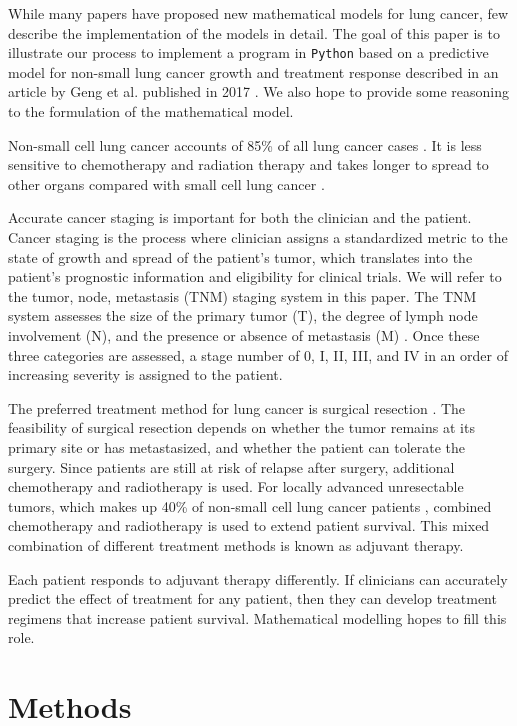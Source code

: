 \documentclass[letterpaper
, superscriptaddress
, twocolumn
, aps
]{revtex4}
\begin{document}
While many papers have proposed new mathematical models for lung cancer, few describe the implementation of the models in detail. The goal of this paper is to illustrate our process to implement a program in \texttt{Python} based on a predictive model for non-small lung cancer growth and treatment response described in an article by Geng et al. published in 2017 \cite{Geng2017}. We also hope to provide some reasoning to the formulation of the mathematical model.

Non-small cell lung cancer accounts of 85\% of all lung cancer cases \cite{Molina2008}. It is less sensitive to chemotherapy and radiation therapy and takes longer to spread to other organs compared with small cell lung cancer \cite{PDQATEB2020}. 

Accurate cancer staging is important for both the clinician and the patient. Cancer staging is the process where clinician assigns a standardized metric to the state of growth and spread of the patient's tumor, which translates into the patient's prognostic information and eligibility for clinical trials. We will refer to the tumor, node, metastasis (TNM) staging system in this paper. The TNM system assesses the size of the primary tumor (T), the degree of lymph node involvement (N), and the presence or absence of metastasis (M) \cite{Tsim2010}. Once these three categories are assessed, a stage number of 0, I, II, III, and IV in an order of increasing severity is assigned to the patient.

The preferred treatment method for lung cancer is surgical resection \cite{Molina2008, PDQATEB2020}. The feasibility of surgical resection depends on whether the tumor remains at its primary site or has metastasized, and whether the patient can tolerate the surgery. Since patients are still at risk of relapse after surgery, additional chemotherapy and radiotherapy is used. For locally advanced unresectable tumors, which makes up 40\% of non-small cell lung cancer patients \cite{Geng2017}, combined chemotherapy and radiotherapy is used to extend patient survival. This mixed combination of different treatment methods is known as adjuvant therapy. 

Each patient responds to adjuvant therapy differently. If clinicians can accurately predict the effect of treatment for any patient, then they can develop treatment regimens that increase patient survival. Mathematical modelling hopes to fill this role.  

\section{Methods}
\end{document}
